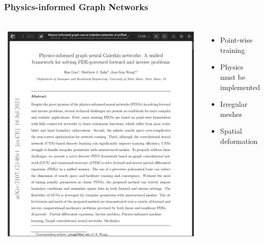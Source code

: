 \documentclass{beamer}
\begin{document}
\begin{frame}
    \frametitle{Physics-informed Graph Networks}
\begin{columns}
\includegraphics[scale=0.12]{figures/PIGNN.png}
\begin{itemize}
    \item Point-wise training
    \item Physics must be implemented
    \item Irregular meshes
    \item Spatial deformation
\end{itemize}
\end{columns}
\end{frame}
\end{document}
